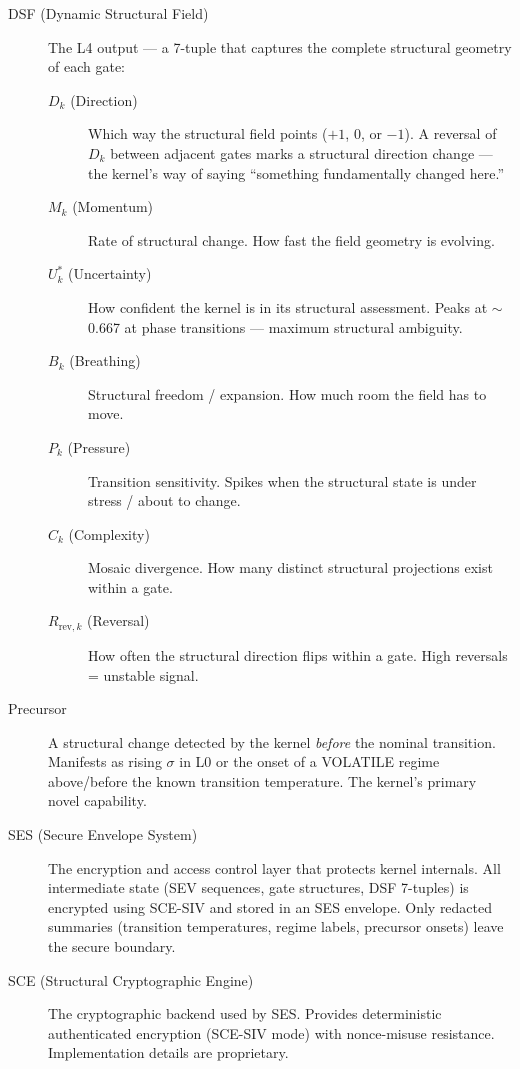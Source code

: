 \documentclass[11pt,letterpaper]{article}
\begin{document}
\begin{description}
  \item[DSF (Dynamic Structural Field)] The L4 output --- a
    7-tuple that captures the complete structural geometry of each gate:
    \begin{description}
      \item[$D_k$ (Direction)] Which way the structural field points
        ($+1$, $0$, or $-1$). A reversal of $D_k$ between adjacent
        gates marks a structural direction change --- the kernel's
        way of saying ``something fundamentally changed here.''
      \item[$M_k$ (Momentum)] Rate of structural change. How fast the
        field geometry is evolving.
      \item[$U^*_k$ (Uncertainty)] How confident the kernel is in its
        structural assessment. Peaks at $\sim$0.667 at phase transitions
        --- maximum structural ambiguity.
      \item[$B_k$ (Breathing)] Structural freedom / expansion. How
        much room the field has to move.
      \item[$P_k$ (Pressure)] Transition sensitivity. Spikes when the
        structural state is under stress / about to change.
      \item[$C_k$ (Complexity)] Mosaic divergence. How many distinct
        structural projections exist within a gate.
      \item[$R_{\text{rev},k}$ (Reversal)] How often the structural
        direction flips within a gate. High reversals = unstable signal.
    \end{description}

  \item[Precursor] A structural change detected by the kernel
    \emph{before} the nominal transition. Manifests as rising $\sigma$
    in L0 or the onset of a VOLATILE regime above/before the known
    transition temperature. The kernel's primary novel capability.

  \item[SES (Secure Envelope System)] The encryption and access
    control layer that protects kernel internals. All intermediate
    state (SEV sequences, gate structures, DSF 7-tuples) is encrypted
    using SCE-SIV and stored in an SES envelope. Only redacted
    summaries (transition temperatures, regime labels, precursor
    onsets) leave the secure boundary.

  \item[SCE (Structural Cryptographic Engine)] The cryptographic
    backend used by SES. Provides deterministic authenticated
    encryption (SCE-SIV mode) with nonce-misuse resistance.
    Implementation details are proprietary.


\end{description}
\end{document}
